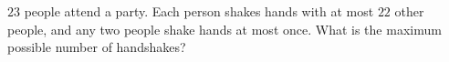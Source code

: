 $23$ people attend a party. Each person shakes hands with at most $22$ other people, and any two people shake hands at most once. What is the maximum possible number of handshakes?
